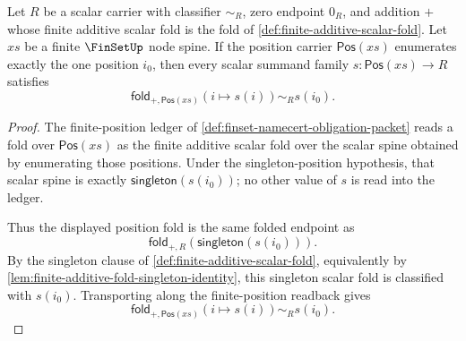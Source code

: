\begin{lemma}
\label{lem:quadrature-singleton-position-fold}
Let $R$ be a scalar carrier with classifier $\sim_R$, zero endpoint $0_R$, and addition $+$ whose finite additive scalar fold is the fold of \autoref{def:finite-additive-scalar-fold}. Let $xs$ be a finite $\FinSetUp$ node spine. If the position carrier $\mathsf{Pos}(xs)$ enumerates exactly the one position $i_0$, then every scalar summand family $s:\mathsf{Pos}(xs)\to R$ satisfies
$$
\mathsf{fold}_{+,\mathsf{Pos}(xs)}(i\mapsto s(i))\sim_R s(i_0).
$$
\end{lemma}
\begin{proof}
The finite-position ledger of \autoref{def:finset-namecert-obligation-packet} reads a fold over $\mathsf{Pos}(xs)$ as the finite additive scalar fold over the scalar spine obtained by enumerating those positions. Under the singleton-position hypothesis, that scalar spine is exactly $\mathsf{singleton}(s(i_0))$; no other value of $s$ is read into the ledger.

Thus the displayed position fold is the same folded endpoint as
$$
\mathsf{fold}_{+,R}(\mathsf{singleton}(s(i_0))).
$$
By the singleton clause of \autoref{def:finite-additive-scalar-fold}, equivalently by \autoref{lem:finite-additive-fold-singleton-identity}, this singleton scalar fold is classified with $s(i_0)$. Transporting along the finite-position readback gives
$$
\mathsf{fold}_{+,\mathsf{Pos}(xs)}(i\mapsto s(i))\sim_R s(i_0).
$$
\end{proof}

